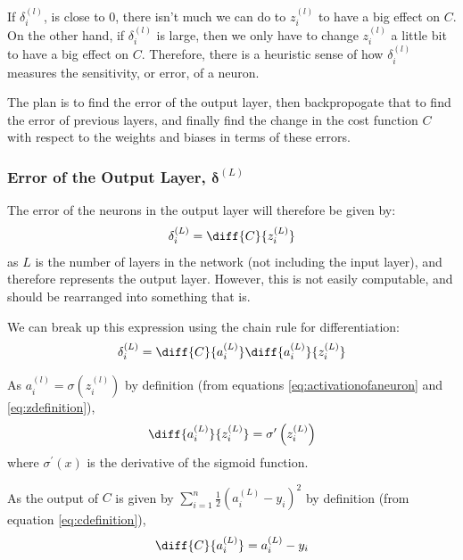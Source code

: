 \documentclass[12pt]{report}
\begin{document}
If ${\delta}^{\left(l\right)}_i$, is close to 0, there isn't much we can do to $z^{\left(l\right)}_i$ to have a big effect on $C$. On the other hand, if ${\delta}^{\left(l\right)}_i$ is large, then we only have to change $z^{\left(l\right)}_i$ a little bit to have a big effect on $C$. Therefore, there is a heuristic sense of how ${\delta}^{\left(l\right)}_i$ measures the sensitivity, or error, of a neuron.

The plan is to find the error of the output layer, then backpropogate that to find the error of previous layers, and finally find the change in the cost function $C$ with respect to the weights and biases in terms of these errors.

\subsubsection{Error of the Output Layer, $\bm{\delta}^{\left(L\right)}$}
The error of the neurons in the output layer will therefore be given by:
\begin{equation}
    {\delta}^{\left(L\right)}_i=\diff{C}{z^{\left(L\right)}_i}
\end{equation}
as $L$ is the number of layers in the network (not including the input layer), and therefore represents the output layer. However, this is not easily computable, and should be rearranged into something that is.

We can break up this expression using the chain rule for differentiation:
\begin{equation}\label{eq:chainrule}
    {\delta}^{\left(L\right)}_i=\diff{C}{a^{\left(L\right)}_i}\diff{a^{\left(L\right)}_i}{z^{\left(L\right)}_i}
\end{equation}

As $a^{\left(l\right)}_i=\sigma \left(z^{\left(l\right)}_i\right)$ by definition (from equations \ref{eq:activationofaneuron} and \ref{eq:zdefinition}),
\begin{equation}\label{eq:dabydz}
    \diff{a^{\left(L\right)}_i}{z^{\left(L\right)}_i}={\sigma}^{\prime} \left(z^{\left(L\right)}_i\right)
\end{equation}
where ${\sigma}^{\prime} \left(x\right)$ is the derivative of the sigmoid function.

As the output of $C$ is given by $\displaystyle\sum_{i=1}^{n}\frac{1}{2}{\left(a^{\left(L\right)}_i-y_i\right)}^2$ by definition (from equation \ref{eq:cdefinition}),
\begin{equation}\label{eq:dcbyda}
    \diff{C}{a^{\left(L\right)}_i}=a^{\left(L\right)}_i-y_i
\end{equation}
\end{document}
